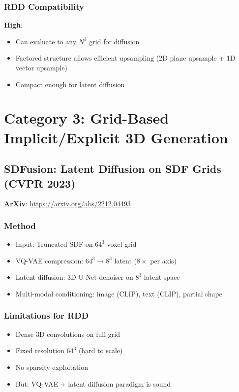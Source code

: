 \documentclass[11pt, a4paper]{article}
\begin{document}
\subsubsection{RDD Compatibility}

\textbf{High}:
\begin{itemize}
    \item Can evaluate to any $N^3$ grid for diffusion
    \item Factored structure allows efficient upsampling (2D plane upsample + 1D vector upsample)
    \item Compact enough for latent diffusion
\end{itemize}

\section{Category 3: Grid-Based Implicit/Explicit 3D Generation}

\subsection{SDFusion: Latent Diffusion on SDF Grids (CVPR 2023)}

\textbf{ArXiv}: \url{https://arxiv.org/abs/2212.04493}

\subsubsection{Method}

\begin{itemize}
    \item Input: Truncated SDF on $64^3$ voxel grid
    \item VQ-VAE compression: $64^3 \to 8^3$ latent ($8\times$ per axis)
    \item Latent diffusion: 3D U-Net denoiser on $8^3$ latent space
    \item Multi-modal conditioning: image (CLIP), text (CLIP), partial shape
\end{itemize}

\subsubsection{Limitations for RDD}

\begin{itemize}
    \item[$\times$] Dense 3D convolutions on full grid
    \item[$\times$] Fixed resolution $64^3$ (hard to scale)
    \item[$\times$] No sparsity exploitation
    \item[$\checkmark$] But: VQ-VAE + latent diffusion paradigm is sound
\end{itemize}
\end{document}
